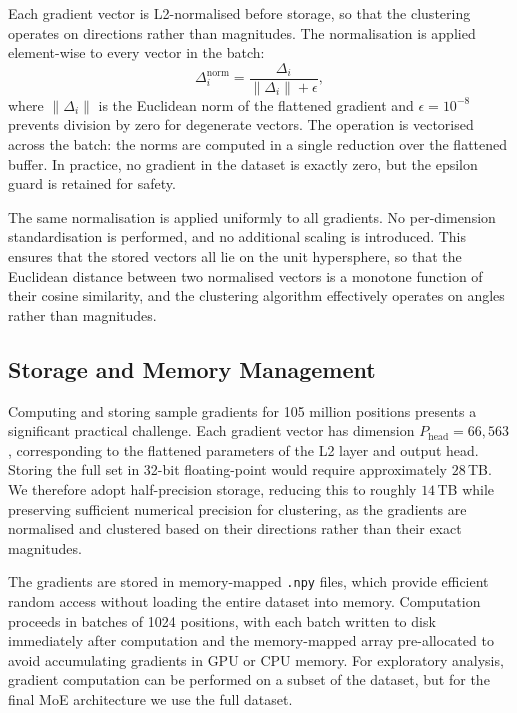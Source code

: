 Each gradient vector is L2-normalised before storage, so that the clustering operates on directions rather than magnitudes. The normalisation is applied element-wise to every vector in the batch:
\[
\Delta_i^{\mathrm{norm}} = \frac{\Delta_i}{\lVert\Delta_i\rVert + \epsilon},
\]
where \(\lVert\Delta_i\rVert\) is the Euclidean norm of the flattened gradient and \(\epsilon = 10^{-8}\) prevents division by zero for degenerate vectors. The operation is vectorised across the batch: the norms are computed in a single reduction over the flattened buffer. In practice, no gradient in the dataset is exactly zero, but the epsilon guard is retained for safety.

The same normalisation is applied uniformly to all gradients. No per-dimension standardisation is performed, and no additional scaling is introduced. This ensures that the stored vectors all lie on the unit hypersphere, so that the Euclidean distance between two normalised vectors is a monotone function of their cosine similarity, and the clustering algorithm effectively operates on angles rather than magnitudes.

\subsection{Storage and Memory Management}\label{sec:grad-storage}

Computing and storing sample gradients for 105 million positions presents a significant practical challenge. Each gradient vector has dimension \(P_{\mathrm{head}} = 66{,}563\), corresponding to the flattened parameters of the L2 layer and output head. Storing the full set in 32-bit floating-point would require approximately \(28\)\,TB. We therefore adopt half-precision storage, reducing this to roughly \(14\)\,TB while preserving sufficient numerical precision for clustering, as the gradients are normalised and clustered based on their directions rather than their exact magnitudes.

The gradients are stored in memory-mapped \texttt{.npy} files, which provide efficient random access without loading the entire dataset into memory. Computation proceeds in batches of 1024 positions, with each batch written to disk immediately after computation and the memory-mapped array pre-allocated to avoid accumulating gradients in GPU or CPU memory. For exploratory analysis, gradient computation can be performed on a subset of the dataset, but for the final MoE architecture we use the full dataset.


